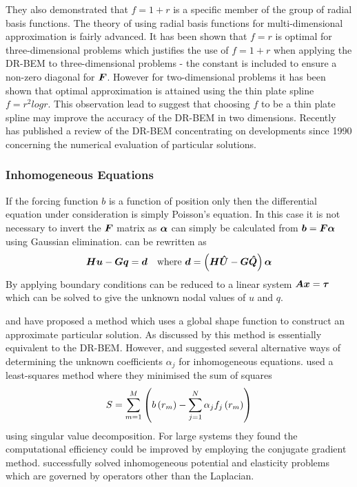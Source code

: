 They also demonstrated that $f = 1 + r$ is a specific member of the group
of radial basis functions.  The theory of using radial basis functions for
multi-dimensional approximation is fairly advanced.  It has been shown that
$f = r$ is optimal for three-dimensional problems which justifies the use
of $f = 1 + r$ when applying the DR-BEM to three-dimensional problems - the
constant is included to ensure a non-zero diagonal for $\matr{F}$.  However
for two-dimensional problems it has been shown that optimal approximation
is attained using the thin plate spline $f = r^{2} log r$.  This
observation lead \citet{golberg:1994} to suggest that choosing $f$ to be a
thin plate spline may improve the accuracy of the DR-BEM in two dimensions.
Recently \citet{golberg:1995} has published a review of the DR-BEM
concentrating on developments since 1990 concerning the numerical
evaluation of particular solutions.

\subsubsection{Inhomogeneous Equations}

If the forcing function $b$ is a function 
of position only then the differential equation under consideration 
is simply Poisson's equation. In this case it is not necessary to 
invert the $\matr{F}$ matrix as $\vect{\alpha}$ can simply be calculated from 
$\vect{b} = \matr{F} \vect{\alpha}$ using Gaussian
elimination.  can be rewritten as
\begin{equation}
  \matr{H} \vect{u} - \matr{G} \vect{q} = \vect{d}\quad\text{where
    }\vect{d} = \pbrac{\matr{H} \matr{\hat{U}} - \matr{G} \matr{\hat{Q}}}
  \vect{\alpha}
\label{eq:drmpoisson}
\end{equation}
By applying boundary 
conditions  can be 
reduced to a linear system $\matr{A} \vect{x} = \vect{\tau}$ which can be
solved to give the unknown nodal values of $u$ and $q$.

\citet{zheng:1991} and \citet{coleman:1991} have proposed
a method which uses a global shape function to construct an approximate
particular solution.  As discussed by \citet{polyzos:1994} this method
is essentially equivalent to the DR-BEM.  However,
\citet{zheng:1991} and \citet{coleman:1991} suggested several
alternative ways of determining the unknown coefficients $\alpha_{j}$ for
inhomogeneous equations.  \citet{zheng:1991} used a least-squares
method where they minimised the sum of squares
\begin{equation}
  S =  \displaystyle\sum_{m=1}^{M}  \left(  b\left( r_{m} \right)  -  \displaystyle\sum_{j=1}^{N} 
    \alpha_{j}  f_{j}\left( r_{m} \right)  \right)
\end{equation}
using singular value decomposition.  For large systems they found the
computational efficiency could be improved by employing the conjugate
gradient method.  \citet{coleman:1991} successfully solved
inhomogeneous potential and elasticity problems which are governed by
operators other than the Laplacian.

